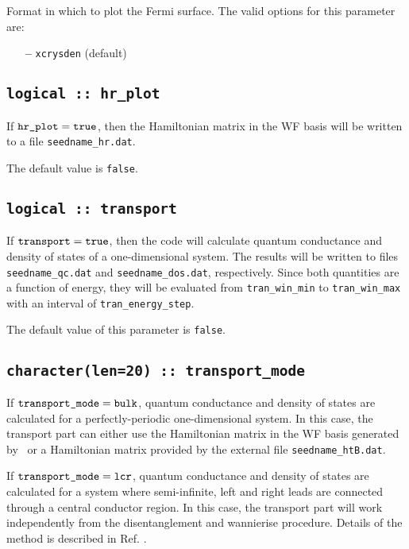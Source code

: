 Format in which to plot the Fermi surface. 
The valid options for this parameter are:
\begin{itemize}
\item[{\bf --}] \verb#xcrysden#  (default)
\end{itemize}

\subsection[hr\_plot]{\tt logical :: hr\_plot}

If $\verb#hr_plot#=\verb#true#$, then the Hamiltonian matrix in the
WF basis will be written to a file {\tt seedname\_hr.dat}.

The default value is {\tt false}.

\subsection[transport]{\tt logical :: transport}

If $\verb#transport#=\verb#true#$, then the code will calculate
quantum conductance and density of states of a one-dimensional system.
The results will be written to files \verb#seedname_qc.dat#
and \verb#seedname_dos.dat#, respectively.
Since both quantities are a function of energy,
they will be evaluated from \verb#tran_win_min# to \verb#tran_win_max#
with an interval of \verb#tran_energy_step#.

The default value of this parameter is \verb#false#.

\subsection[transport\_mode]{\tt character(len=20) :: transport\_mode}

If $\verb#transport_mode#=\verb#bulk#$, quantum conductance
and density of states are calculated for a perfectly-periodic one-dimensional system.
In this case, the transport part can either use 
the Hamiltonian matrix in the WF basis generated by \wannier\
or a Hamiltonian matrix provided by the external file
{\tt seedname\_htB.dat}.

If $\verb#transport_mode#=\verb#lcr#$, quantum conductance and density
of states are calculated for a system where semi-infinite, left and
right leads are connected through a central conductor region.  In this
case, the transport part will work independently from the
disentanglement and wannierise procedure.  Details of the method is
described in Ref. \cite{nardelli-prb99}.

